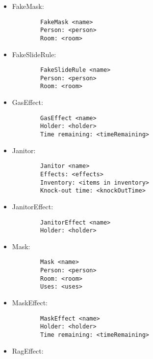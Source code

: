 \begin{itemize}
\begin{itemize}
\begin{itemize}
        \item FakeMask:

        \begin{verbatim}
        FakeMask <name>
        Person: <person>
        Room: <room>
        \end{verbatim}

        \item FakeSlideRule:

        \begin{verbatim}
        FakeSlideRule <name>
        Person: <person>
        Room: <room>
        \end{verbatim}

        \item GasEffect:

        \begin{verbatim}
        GasEffect <name>
        Holder: <holder>
        Time remaining: <timeRemaining>
        \end{verbatim}

        \item Janitor:

        \begin{verbatim}
        Janitor <name>
        Effects: <effects>
        Inventory: <items in inventory>
        Knock-out time: <knockOutTime>
        \end{verbatim}

        \item JanitorEffect:

        \begin{verbatim}
        JanitorEffect <name>
        Holder: <holder>
        \end{verbatim}

        \item Mask:

        \begin{verbatim}
        Mask <name>
        Person: <person>
        Room: <room>
        Uses: <uses>
        \end{verbatim}

        \item MaskEffect:

        \begin{verbatim}
        MaskEffect <name>
        Holder: <holder>
        Time remaining: <timeRemaining>
        \end{verbatim}

        \item RagEffect:


\end{itemize}
\end{itemize}
\end{itemize}
